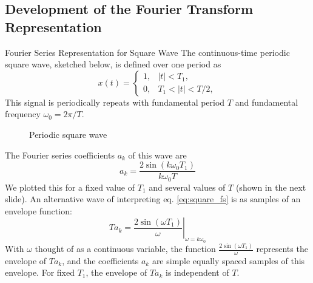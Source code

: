 \subsection{Development of the Fourier Transform Representation}

\begin{frame}[plain]{Fourier Series Representation for Square Wave}
        The continuous-time periodic square wave, sketched below, is defined over one period as
        \begin{equation*}
            x(t) = \begin{cases}
                1, & |t| <T_1,\\
                0, & T_1 < |t| < T/2,
            \end{cases}
        \end{equation*}
        This signal is periodically repeats with fundamental period $T$ and fundamental frequency $\omega_0 = 2\pi/T$.
    {
        \begin{figure}
          \centering
          
          \caption{Periodic square wave}\label{fi:example02_periodic_square_wave }
        \end{figure}
    }
\end{frame}



\begin{frame}
    The Fourier series coefficients $a_k$ of this wave are
    \begin{equation}\label{eq:square_fs}
        a_k = \frac{2\sin(k\omega_0T_1)}{k\omega_0T}
    \end{equation}
    We plotted this for a fixed value of $T_1$ and several values of $T$ (shown in the next slide). An alternative wave of interpreting eq. \ref{eq:square_fs} is as samples of an envelope function:
    \begin{equation*}
        Ta_k = \left.\frac{2\sin(\omega T_1)}{\omega}\right|_{\omega=k\omega_0}
    \end{equation*}
    \pause
    With $\omega$ thought of as a continuous variable, the function $\frac{2\sin(\omega T_1)}{\omega}$ represents the envelope of $Ta_k$, and the coefficients $a_k$ are simple equally spaced samples of this envelope.
    For fixed $T_1$, the envelope of $Ta_k$ is independent of $T$.
    \pause


\end{frame}

